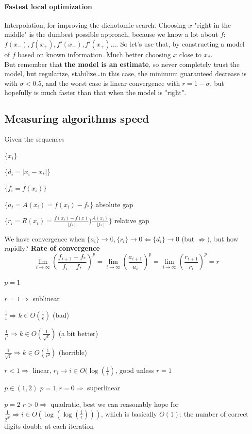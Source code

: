 \documentclass[10pt]{report}
\begin{document}
\paragraph{Fastest local optimization} Interpolation, for improving the dichotomic search. Choosing $x$ "right in the middle" is the dumbest possible approach, because we know a lot about $f$: $f(x_-), f(x_+), f'(x_-), f'(x_+)\ldots$. So let's use that, by constructing a model of $f$ based on known information. Much better choosing $x$ close to $x_*$.\\
But remember that \textbf{the model is an estimate}, so never completely trust the model, but regularize, stabilize\ldots in this case, the minimum guaranteed decrease is with $\sigma < 0.5$, and the worst case is linear convergence with $r = 1 - \sigma$, but hopefully is much faster than that when the model is "right".
\pagebreak
\subsection{Measuring algorithms speed} Given the sequences \begin{list}{}{}
	\item $\{x_i\}$
	\item $\{d_i = |x_i - x_*|\}$
	\item $\{f_i = f(x_i)\}$
	\item $\{a_i = A(x_i) = f(x_i) - f_*\}$ absolute gap
	\item $\{r_i = R(x_i) = \frac{f(x_i) - f(x)}{|f_*|} ) \frac{A(x_i)}{|f_*|}\}$ relative gap
\end{list}
We have convergence when $\{a_i\} \rightarrow 0, \{r_i\} \rightarrow 0 \Leftarrow \{d_i\} \rightarrow 0$ (but $\not\Rightarrow)$, but how rapidly? \textbf{Rate of convergence}
$$\lim_{i\to\infty} \left(\frac{f_{i+1} - f_*}{f_i - f_*}\right)^p = \lim_{i\to\infty} \left(\frac{a_{i+1}}{a_i}\right)^p = \lim_{i\to\infty} \left(\frac{r_{i+1}}{r_i}\right)^p = r$$
\begin{list}{}{}
	\item[$p = 1$]\begin{list}{}{}
		\item $r = 1\Rightarrow$ sublinear \begin{list}{}{}
			\item $\frac{1}{i} \Rightarrow k \in O(\frac{1}{\epsilon})$ (bad)
			\item $\frac{1}{i^2} \Rightarrow k \in O(\frac{1}{\sqrt{\epsilon}})$ (a bit better)
			\item $\frac{1}{\sqrt{i}} \Rightarrow k \in O(\frac{1}{\epsilon^2})$ (horrible)
		\end{list}
		\item $r < 1\Rightarrow$ linear, $r_i \rightarrow i \in O(\log(\frac{1}{\epsilon})$, good unless $r = 1$
	\end{list}
	\item[$p \in (1,2)$] $p = 1, r = 0\Rightarrow$ superlinear
	\item[$p = 2$] $r > 0\Rightarrow$ quadratic, best we can reasonably hope for\\
	$\frac{1}{2^{2^i}} \Rightarrow i \in O(\log(\log(\frac{1}{\epsilon})))$, which is basically $O(1)$: the number of correct digits double at each iteration
\end{list}
\end{document}
